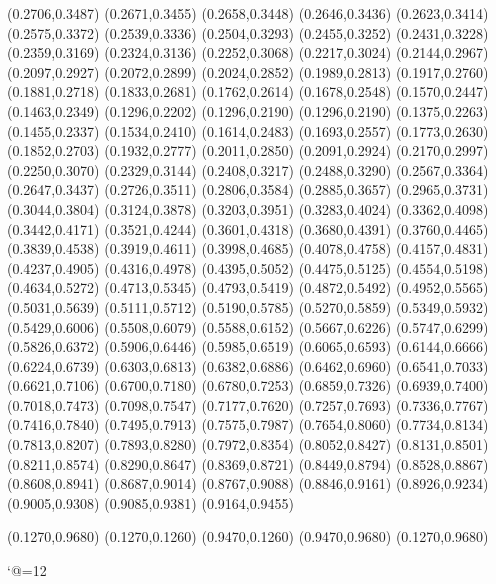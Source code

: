 \PST@Diamond(0.2706,0.3487)
\PST@Diamond(0.2671,0.3455)
\PST@Diamond(0.2658,0.3448)
\PST@Diamond(0.2646,0.3436)
\PST@Diamond(0.2623,0.3414)
\PST@Diamond(0.2575,0.3372)
\PST@Diamond(0.2539,0.3336)
\PST@Diamond(0.2504,0.3293)
\PST@Diamond(0.2455,0.3252)
\PST@Diamond(0.2431,0.3228)
\PST@Diamond(0.2359,0.3169)
\PST@Diamond(0.2324,0.3136)
\PST@Diamond(0.2252,0.3068)
\PST@Diamond(0.2217,0.3024)
\PST@Diamond(0.2144,0.2967)
\PST@Diamond(0.2097,0.2927)
\PST@Diamond(0.2072,0.2899)
\PST@Diamond(0.2024,0.2852)
\PST@Diamond(0.1989,0.2813)
\PST@Diamond(0.1917,0.2760)
\PST@Diamond(0.1881,0.2718)
\PST@Diamond(0.1833,0.2681)
\PST@Diamond(0.1762,0.2614)
\PST@Diamond(0.1678,0.2548)
\PST@Diamond(0.1570,0.2447)
\PST@Diamond(0.1463,0.2349)
\PST@Diamond(0.1296,0.2202)
\PST@Dashed(0.1296,0.2190)
(0.1296,0.2190)
(0.1375,0.2263)
(0.1455,0.2337)
(0.1534,0.2410)
(0.1614,0.2483)
(0.1693,0.2557)
(0.1773,0.2630)
(0.1852,0.2703)
(0.1932,0.2777)
(0.2011,0.2850)
(0.2091,0.2924)
(0.2170,0.2997)
(0.2250,0.3070)
(0.2329,0.3144)
(0.2408,0.3217)
(0.2488,0.3290)
(0.2567,0.3364)
(0.2647,0.3437)
(0.2726,0.3511)
(0.2806,0.3584)
(0.2885,0.3657)
(0.2965,0.3731)
(0.3044,0.3804)
(0.3124,0.3878)
(0.3203,0.3951)
(0.3283,0.4024)
(0.3362,0.4098)
(0.3442,0.4171)
(0.3521,0.4244)
(0.3601,0.4318)
(0.3680,0.4391)
(0.3760,0.4465)
(0.3839,0.4538)
(0.3919,0.4611)
(0.3998,0.4685)
(0.4078,0.4758)
(0.4157,0.4831)
(0.4237,0.4905)
(0.4316,0.4978)
(0.4395,0.5052)
(0.4475,0.5125)
(0.4554,0.5198)
(0.4634,0.5272)
(0.4713,0.5345)
(0.4793,0.5419)
(0.4872,0.5492)
(0.4952,0.5565)
(0.5031,0.5639)
(0.5111,0.5712)
(0.5190,0.5785)
(0.5270,0.5859)
(0.5349,0.5932)
(0.5429,0.6006)
(0.5508,0.6079)
(0.5588,0.6152)
(0.5667,0.6226)
(0.5747,0.6299)
(0.5826,0.6372)
(0.5906,0.6446)
(0.5985,0.6519)
(0.6065,0.6593)
(0.6144,0.6666)
(0.6224,0.6739)
(0.6303,0.6813)
(0.6382,0.6886)
(0.6462,0.6960)
(0.6541,0.7033)
(0.6621,0.7106)
(0.6700,0.7180)
(0.6780,0.7253)
(0.6859,0.7326)
(0.6939,0.7400)
(0.7018,0.7473)
(0.7098,0.7547)
(0.7177,0.7620)
(0.7257,0.7693)
(0.7336,0.7767)
(0.7416,0.7840)
(0.7495,0.7913)
(0.7575,0.7987)
(0.7654,0.8060)
(0.7734,0.8134)
(0.7813,0.8207)
(0.7893,0.8280)
(0.7972,0.8354)
(0.8052,0.8427)
(0.8131,0.8501)
(0.8211,0.8574)
(0.8290,0.8647)
(0.8369,0.8721)
(0.8449,0.8794)
(0.8528,0.8867)
(0.8608,0.8941)
(0.8687,0.9014)
(0.8767,0.9088)
(0.8846,0.9161)
(0.8926,0.9234)
(0.9005,0.9308)
(0.9085,0.9381)
(0.9164,0.9455)

\PST@Border(0.1270,0.9680)
(0.1270,0.1260)
(0.9470,0.1260)
(0.9470,0.9680)
(0.1270,0.9680)

\catcode`@=12
\fi
\endpspicture
